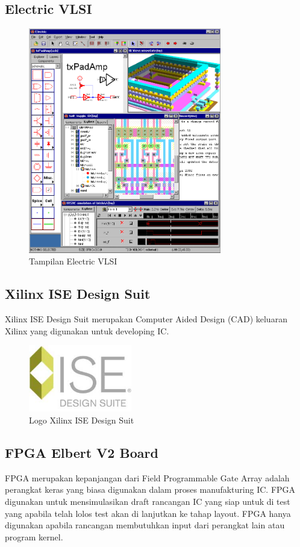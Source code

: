 \subsection{Electric VLSI}

\begin{figure}
	\centering
	\includegraphics[width=0.75\textwidth]
	{pics/electricvlsi.png}
	\caption{Tampilan Electric VLSI}
	\label{fig:vlsi}
\end{figure}

\subsection{Xilinx ISE Design Suit}
Xilinx ISE Design Suit merupakan Computer Aided Design (CAD) keluaran Xilinx yang digunakan untuk developing IC.

\begin{figure}
	\centering
	\includegraphics[width=0.4\textwidth]
	{pics/ise-logo.jpg}
	\caption{Logo Xilinx ISE Design Suit}
	\label{ise}
\end{figure}

\subsection{FPGA Elbert V2 Board}
FPGA merupakan kepanjangan dari Field Programmable Gate Array adalah perangkat keras yang biasa digunakan dalam proses manufakturing IC. FPGA digunakan untuk mensimulasikan draft rancangan IC yang siap untuk di test yang apabila telah lolos test akan di lanjutkan ke tahap layout. FPGA hanya digunakan apabila rancangan membutuhkan input dari perangkat lain atau program kernel.

